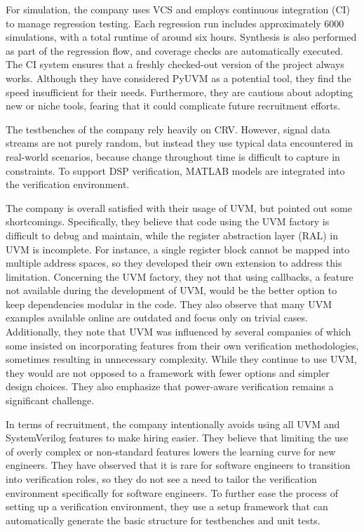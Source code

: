 \documentclass[12pt]{report}
\begin{document}
For simulation, the company uses VCS and employs continuous integration (CI) to manage regression testing. Each
regression run includes approximately 6000 simulations, with a total runtime of around six hours. Synthesis is also
performed as part of the regression flow, and coverage checks are automatically executed. The CI system ensures that
a freshly checked-out version of the project always works. Although they have considered PyUVM as a potential tool,
they find the speed insufficient for their needs. Furthermore, they are cautious about adopting new or niche tools,
fearing that it could complicate future recruitment efforts.

The testbenches of the company rely heavily on CRV. However, signal data streams are not purely random, but instead
they use typical data encountered in real-world scenarios, because change throughout time is difficult to capture in
constraints. To support DSP verification, MATLAB models are integrated into the verification environment.

The company is overall satisfied with their usage of UVM, but pointed out some shortcomings. Specifically, they
believe that code using the UVM factory is difficult to debug and maintain, while the register abstraction layer
(RAL) in UVM is incomplete. For instance, a single register block cannot be mapped into multiple address spaces, so
they developed their own extension to address this limitation. Concerning the UVM factory, they not that using
callbacks, a feature not available during the development of UVM, would be the better option to keep dependencies
modular in the code. They also observe that many UVM examples available online are outdated and focus only on trivial
cases. Additionally, they note that UVM was influenced by several companies of which some insisted on incorporating
features from their own verification methodologies, sometimes resulting in unnecessary complexity. While they
continue to use UVM, they would are not opposed to a framework with fewer options and simpler design choices. They
also emphasize that power-aware verification remains a significant challenge.

In terms of recruitment, the company intentionally avoids using all UVM and SystemVerilog features to make hiring
easier. They believe that limiting the use of overly complex or non-standard features lowers the learning curve for
new engineers. They have observed that it is rare for software engineers to transition into verification roles, so
they do not see a need to tailor the verification environment specifically for software engineers. To further ease
the process of setting up a verification environment, they use a setup framework that can automatically generate the
basic structure for testbenches and unit tests.
\end{document}

